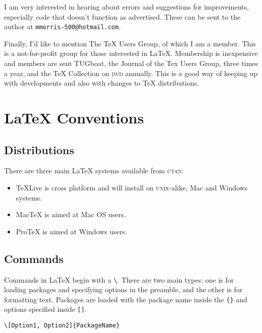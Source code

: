 \documentclass[a4paper]{article}
\begin{document}
I am very interested in hearing about errors and suggestions for improvements, especially code that doesn't function as advertised. These can be sent to the author at \texttt{mmorris-500@hotmail.com}. 

Finally, I'd like to mention The TeX Users Group, of which I am a member. This is a not-for-profit group for those interested in LaTeX. Membership is inexpensive and members are sent TUGboat, the Journal of the Tex Users Group, three times a year, and the TeX Collection on \textsc{dvd} annually. This is a good way of keeping up with developments and also with changes to TeX distributions.




\clearpage


\section{LaTeX Conventions}

\subsection{Distributions}

There are three main LaTeX systems available from \textsc{ctan}: 

\begin{itemize}
\item TeXLive is cross platform and will install on \textsc{unix}-alike, Mac and Windows systems.

\item MacTeX is aimed at Mac OS users.

\item ProTeX is aimed at Windows users.
\end{itemize}

\subsection{Commands}



Commands in LaTeX begin with a \texttt{\textbackslash}. There are two main types: one is for loading packages and specifying options in the preamble, and the other is for formatting text. Packages are loaded with the package name inside the \texttt{\{\}} and options specified inside \texttt{[]}. 

\begin{verbatim}
\[Option1, Option2]{PackageName}
\end{verbatim}
\end{document}
